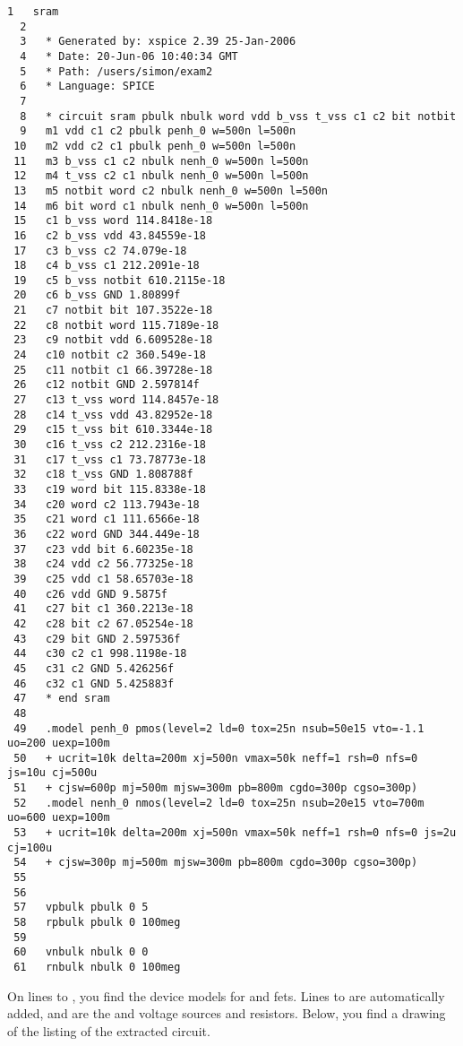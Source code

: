 \small \begin{Verbatim}[frame=single]
  1   sram
  2
  3   * Generated by: xspice 2.39 25-Jan-2006
  4   * Date: 20-Jun-06 10:40:34 GMT
  5   * Path: /users/simon/exam2
  6   * Language: SPICE
  7
  8   * circuit sram pbulk nbulk word vdd b_vss t_vss c1 c2 bit notbit
  9   m1 vdd c1 c2 pbulk penh_0 w=500n l=500n
 10   m2 vdd c2 c1 pbulk penh_0 w=500n l=500n
 11   m3 b_vss c1 c2 nbulk nenh_0 w=500n l=500n
 12   m4 t_vss c2 c1 nbulk nenh_0 w=500n l=500n
 13   m5 notbit word c2 nbulk nenh_0 w=500n l=500n
 14   m6 bit word c1 nbulk nenh_0 w=500n l=500n
 15   c1 b_vss word 114.8418e-18
 16   c2 b_vss vdd 43.84559e-18
 17   c3 b_vss c2 74.079e-18
 18   c4 b_vss c1 212.2091e-18
 19   c5 b_vss notbit 610.2115e-18
 20   c6 b_vss GND 1.80899f
 21   c7 notbit bit 107.3522e-18
 22   c8 notbit word 115.7189e-18
 23   c9 notbit vdd 6.609528e-18
 24   c10 notbit c2 360.549e-18
 25   c11 notbit c1 66.39728e-18
 26   c12 notbit GND 2.597814f
 27   c13 t_vss word 114.8457e-18
 28   c14 t_vss vdd 43.82952e-18
 29   c15 t_vss bit 610.3344e-18
 30   c16 t_vss c2 212.2316e-18
 31   c17 t_vss c1 73.78773e-18
 32   c18 t_vss GND 1.808788f
 33   c19 word bit 115.8338e-18
 34   c20 word c2 113.7943e-18
 35   c21 word c1 111.6566e-18
 36   c22 word GND 344.449e-18
 37   c23 vdd bit 6.60235e-18
 38   c24 vdd c2 56.77325e-18
 39   c25 vdd c1 58.65703e-18
 40   c26 vdd GND 9.5875f
 41   c27 bit c1 360.2213e-18
 42   c28 bit c2 67.05254e-18
 43   c29 bit GND 2.597536f
 44   c30 c2 c1 998.1198e-18
 45   c31 c2 GND 5.426256f
 46   c32 c1 GND 5.425883f
 47   * end sram
 48
 49   .model penh_0 pmos(level=2 ld=0 tox=25n nsub=50e15 vto=-1.1 uo=200 uexp=100m
 50   + ucrit=10k delta=200m xj=500n vmax=50k neff=1 rsh=0 nfs=0 js=10u cj=500u
 51   + cjsw=600p mj=500m mjsw=300m pb=800m cgdo=300p cgso=300p)
 52   .model nenh_0 nmos(level=2 ld=0 tox=25n nsub=20e15 vto=700m uo=600 uexp=100m
 53   + ucrit=10k delta=200m xj=500n vmax=50k neff=1 rsh=0 nfs=0 js=2u cj=100u
 54   + cjsw=300p mj=500m mjsw=300m pb=800m cgdo=300p cgso=300p)
 55
 56
 57   vpbulk pbulk 0 5
 58   rpbulk pbulk 0 100meg
 59
 60   vnbulk nbulk 0 0
 61   rnbulk nbulk 0 100meg
\end{Verbatim}
\normalsize
On lines  to , you find the
device models for  and  fets.
Lines  to  are automatically added,
and are the  and  voltage sources and resistors.
Below, you find a drawing of the listing of the extracted circuit.

\begin{figure}[h]
\centerline{}
\end{figure}


